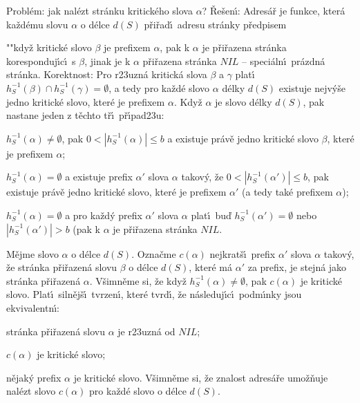 \flushpar Probl\'em: jak nal\'ezt str\'anku kritick\'eho slova 
$\alpha$?\newline 
\v Re\v sen\'\i : Adres\'a\v r je funkce, kter\'a ka\v zd\'emu slovu $
\alpha$ o 
d\'elce $d(S)$ p\v ri\v rad\'\i\ adresu str\'anky p\v redpisem
\roster
\item"{}"kdy\v z kritick\'e slovo $\beta$ je prefixem $\alpha$, pak k $
\alpha$ je 
p\v ri\v razena str\'an\-ka koresponduj\'\i c\'\i\ s $\beta$, jinak je k $
\alpha$ 
p\v ri\v razena str\'an\-ka $NIL$ -- speci\'aln\'\i\ pr\'azdn\'a str\'anka.
\endroster
\flushpar Korektnost: Pro r\accent23uzn\'a kritick\'a slova 
$\beta$ a $\gamma$ plat\'\i\ $h^{-1}_S(\beta )\cap h^{-1}_S(\gamma 
)=\emptyset$, a tedy pro ka\v zd\'e slovo $\alpha$ 
d\'elky $d(S)$ existuje nejv\'y\v se jedno kritick\'e slovo, kter\'e 
je prefixem $\alpha$. Kdy\v z $\alpha$ je slovo d\'elky $d(S)$, pak nastane 
jeden z t\v echto t\v r\'\i\ p\v r\'\i pad\accent23u:
\roster
\item
$h^{-1}_S(\alpha )\ne\emptyset$, pak $0<|h^{-1}_S(\alpha )|\le b$ a existuje pr\'av\v e jedno kritick\'e slovo $
\beta$, 
kter\'e je prefixem $\alpha$; 
\item
$h^{-1}_S(\alpha )=\emptyset$ a existuje prefix $\alpha'$ slova $
\alpha$ takov\'y, \v ze 
$0<|h^{-1}_S(\alpha')|\le b$, pak existuje pr\'av\v e jedno kritick\'e slovo, kter\'e je 
prefixem $\alpha'$ (a tedy tak\'e prefixem $\alpha$);
\item
$h^{-1}_S(\alpha )=\emptyset$ a pro ka\v zd\'y prefix $\alpha'$ slova $
\alpha$ plat\'\i\ bu\v d 
$h^{-1}_S(\alpha')=\emptyset$ nebo $|h^{-1}_S(\alpha')|>b$ (pak k $
\alpha$ je p\v ri\v razena 
str\'anka $NIL$.
\endroster

\flushpar M\v ejme slovo $\alpha$ o d\'elce $d(S)$. Ozna\v cme $c
(\alpha )$ nejkrat\v s\'\i\ 
prefix $\alpha'$ slova $\alpha$ takov\'y, \v ze str\'anka p\v ri\v razen\'a slovu $
\beta$ o 
d\'elce $d(S)$, kter\'e m\'a $\alpha'$ za prefix, je stejn\'a jako str\'anka 
p\v ri\v razen\'a $\alpha$. V\v simn\v eme si, \v ze kdy\v z $h^{
-1}_S(\alpha )\ne\emptyset$, pak $c(\alpha )$ je 
kritick\'e slovo. Plat\'\i\ siln\v ej\v s\'\i\ tvrzen\'\i , kter\'e tvrd\'\i , \v ze 
n\'asleduj\'\i c\'\i\ podm\'\i nky jsou ekvivalentn\'\i :
\roster
\item
str\'anka p\v ri\v razen\'a slovu $\alpha$ je r\accent23uzn\'a od $NIL$;
\item
$c(\alpha )$ je kritick\'e slovo;
\item
n\v ejak\'y prefix $\alpha$ je kritick\'e slovo.
\endroster
V\v simn\v eme si, \v ze znalost adres\'a\v re umo\v z\v nuje nal\'ezt slovo 
$c(\alpha )$ pro ka\v zd\'e slovo o d\'elce $d(S)$.
\medskip

